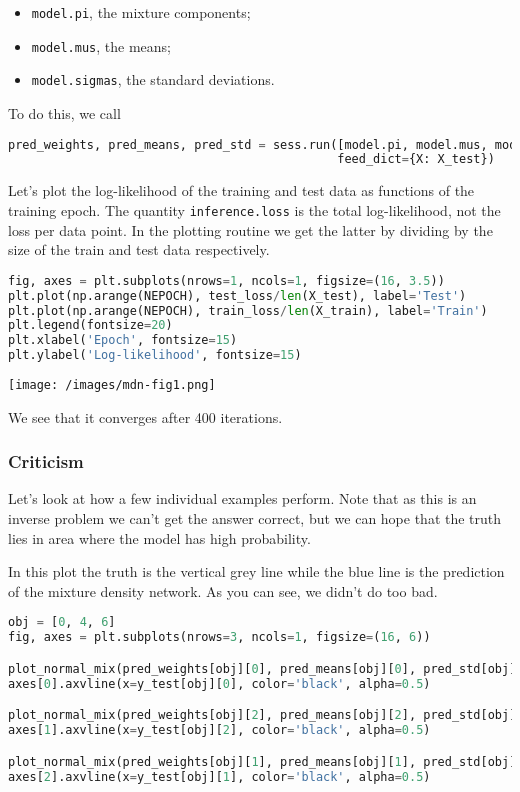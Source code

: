 \begin{itemize}
\item
\texttt{model.pi}, the mixture components;
\item
\texttt{model.mus}, the means;
\item
\texttt{model.sigmas}, the standard deviations.
\end{itemize}

To do this, we call
\begin{lstlisting}[language=Python]
pred_weights, pred_means, pred_std = sess.run([model.pi, model.mus, model.sigmas],
                                              feed_dict={X: X_test})
\end{lstlisting}

Let's plot the log-likelihood of the training and test data as
functions of the training epoch. The quantity \texttt{inference.loss}
is the total log-likelihood, not the loss per data point.  In the
plotting routine we get the latter by dividing by the size of the
train and test data respectively.

\begin{lstlisting}[language=Python]
fig, axes = plt.subplots(nrows=1, ncols=1, figsize=(16, 3.5))
plt.plot(np.arange(NEPOCH), test_loss/len(X_test), label='Test')
plt.plot(np.arange(NEPOCH), train_loss/len(X_train), label='Train')
plt.legend(fontsize=20)
plt.xlabel('Epoch', fontsize=15)
plt.ylabel('Log-likelihood', fontsize=15)
\end{lstlisting}

\texttt{[image: /images/mdn-fig1.png]}

We see that it converges after 400 iterations.

\subsubsection{Criticism}

Let's look at how a few individual examples perform. Note that as this
is an inverse problem we can't get the answer correct, but we can hope
that the truth lies in area where the model has high probability.

In this plot the truth is the vertical grey line while the blue line is the prediction of the mixture density network. As you can see, we didn't do too bad.

\begin{lstlisting}[language=Python]
obj = [0, 4, 6]
fig, axes = plt.subplots(nrows=3, ncols=1, figsize=(16, 6))

plot_normal_mix(pred_weights[obj][0], pred_means[obj][0], pred_std[obj][0], axes[0], comp=False)
axes[0].axvline(x=y_test[obj][0], color='black', alpha=0.5)

plot_normal_mix(pred_weights[obj][2], pred_means[obj][2], pred_std[obj][2], axes[1], comp=False)
axes[1].axvline(x=y_test[obj][2], color='black', alpha=0.5)

plot_normal_mix(pred_weights[obj][1], pred_means[obj][1], pred_std[obj][1], axes[2], comp=False)
axes[2].axvline(x=y_test[obj][1], color='black', alpha=0.5)
\end{lstlisting}

